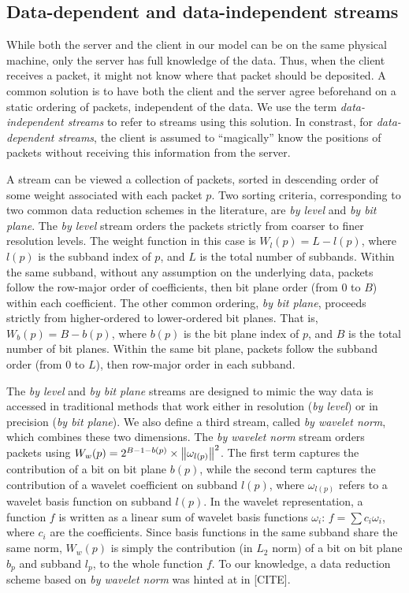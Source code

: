 \subsection{Data-dependent and data-independent streams}\label{sec:static-dynamic-streams}

While both the server and the client in our model can be on the same physical machine, only the
server has full knowledge of the data. Thus, when the client receives a packet, it might not know
where that packet should be deposited. A common solution is to have both the client and the server
agree beforehand on a static ordering of packets, independent of the data. We use the term
\emph{data-independent streams} to refer to streams using this solution. In constrast, for
\emph{data-dependent streams}, the client is assumed to ``magically'' know the positions of packets
without receiving this information from the server.

A stream can be viewed a collection of packets, sorted in descending order of some weight associated
with each packet $p$. Two sorting criteria, corresponding to two common data reduction schemes in
the literature, are \emph{by level} and \emph{by bit plane}. The \emph{by level} stream orders the
packets strictly from coarser to finer resolution levels. The weight function in this case is
$W_l(p)=L-l(p)$, where $l(p)$ is the subband index of $p$, and $L$ is the total number of subbands.
Within the same subband, without any assumption on the underlying data, packets follow the row-major
order of coefficients, then bit plane order (from 0 to $B$) within each coefficient. The other
common ordering, \emph{by bit plane}, proceeds strictly from higher-ordered to lower-ordered bit
planes. That is, $W_b(p)=B-b(p)$, where $b(p)$ is the bit plane index of $p$, and $B$ is the total
number of bit planes. Within the same bit plane, packets follow the subband order (from 0 to $L$),
then row-major order in each subband.

The \emph{by level} and \emph{by bit plane} streams are designed to mimic the way data is accessed
in traditional methods that work either in resolution (\emph{by level}) or in precision (\emph{by
bit plane}). We also define a third stream, called \emph{by wavelet norm}, which combines these two
dimensions. The \emph{by wavelet norm} stream orders packets using $W_w(p)=2^{B-1-b(p)}\times
\left\lVert\omega_{l(p)}\right\rVert^2$. The first term captures the contribution of a bit on bit plane $b(p)$,
while the second term captures the contribution of a wavelet coefficient on subband $l(p)$, where
$\omega_{l(p)}$ refers to a wavelet basis function on subband $l(p)$. In the wavelet representation,
a function $f$ is written as a linear sum of wavelet basis functions $\omega_i$:
$f=\sum{c_i\omega_i}$, where $c_i$ are the coefficients. Since basis functions in the same subband
share the same norm, $W_w(p)$ is simply the contribution (in $L_2$ norm) of a bit on bit plane $b_p$
and subband $l_p$, to the whole function $f$. To our knowledge, a data reduction scheme based on
\emph{by wavelet norm} was hinted at in [CITE]. 

